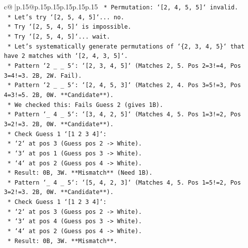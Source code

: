 \documentclass{article}
\begin{document}
{\begin{supertabular}{c@{$\;$}|p{.15\linewidth}@{}p{.15\linewidth}p{.15\linewidth}p{.15\linewidth}p{.15\linewidth}p{.15\linewidth}}
{{{\texttt{                *   Permutation: `{[}2, 4, 5, 5{]}` invalid.} \\
\texttt{                *   Let's try `{[}2, 5, 4, 5{]}`... no.} \\
\texttt{                *   Try `{[}2, 5, 4, 5{]}` is impossible.} \\
\texttt{                *   Try `{[}2, 5, 4, 5{]}`... wait.} \\
\texttt{                *   Let's systematically generate permutations of `\{2, 3, 4, 5\}` that have 2 matches with `{[}2, 4, 3, 5{]}`.} \\
\texttt{                    *   Pattern `2 \_ \_ 5`: `{[}2, 3, 4, 5{]}` (Matches 2, 5. Pos 2=3!=4, Pos 3=4!=3. 2B, 2W. Fail).} \\
\texttt{                    *   Pattern `2 \_ \_ 5`: `{[}2, 4, 5, 3{]}` (Matches 2, 4. Pos 3=5!=3, Pos 4=3!=5. 2B, 0W. **Candidate**).} \\
\texttt{                        *   We checked this: Fails Guess 2 (gives 1B).} \\
\texttt{                    *   Pattern `\_ 4 \_ 5`: `{[}3, 4, 2, 5{]}` (Matches 4, 5. Pos 1=3!=2, Pos 3=2!=3. 2B, 0W. **Candidate**).} \\
\texttt{                        *   Check Guess 1 `{[}1 2 3 4{]}`:} \\
\texttt{                            *   `2` at pos 3 (Guess pos 2 {-}> White).} \\
\texttt{                            *   `3` at pos 1 (Guess pos 3 {-}> White).} \\
\texttt{                            *   `4` at pos 2 (Guess pos 4 {-}> White).} \\
\texttt{                            *   Result: 0B, 3W. **Mismatch** (Need 1B).} \\
\texttt{                    *   Pattern `\_ 4 \_ 5`: `{[}5, 4, 2, 3{]}` (Matches 4, 5. Pos 1=5!=2, Pos 3=2!=3. 2B, 0W. **Candidate**).} \\
\texttt{                        *   Check Guess 1 `{[}1 2 3 4{]}`:} \\
\texttt{                            *   `2` at pos 3 (Guess pos 2 {-}> White).} \\
\texttt{                            *   `3` at pos 4 (Guess pos 3 {-}> White).} \\
\texttt{                            *   `4` at pos 2 (Guess pos 4 {-}> White).} \\
\texttt{                            *   Result: 0B, 3W. **Mismatch**.} \\
}}}
\end{supertabular}}
\end{document}
